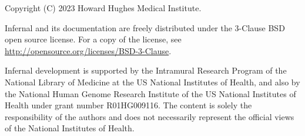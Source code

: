 \newpage
\vspace*{\fill}
\begin{flushleft}

\vspace{2em}
Copyright (C) 2023 Howard Hughes Medical Institute.

\vspace{2em}
Infernal and its documentation are freely distributed under the 
3-Clause BSD open source license. For a copy of the license, see
\url{http://opensource.org/licenses/BSD-3-Clause}.

\vspace{2em}
Infernal development is supported by the Intramural Research Program
of the National Library of Medicine at the US National Institutes of
Health, and also by the National Human Genome Research Institute of
the US National Institutes of Health under grant number
R01HG009116. The content is solely the responsibility of the authors
and does not necessarily represent the official views of the National
Institutes of Health.

\end{flushleft}





